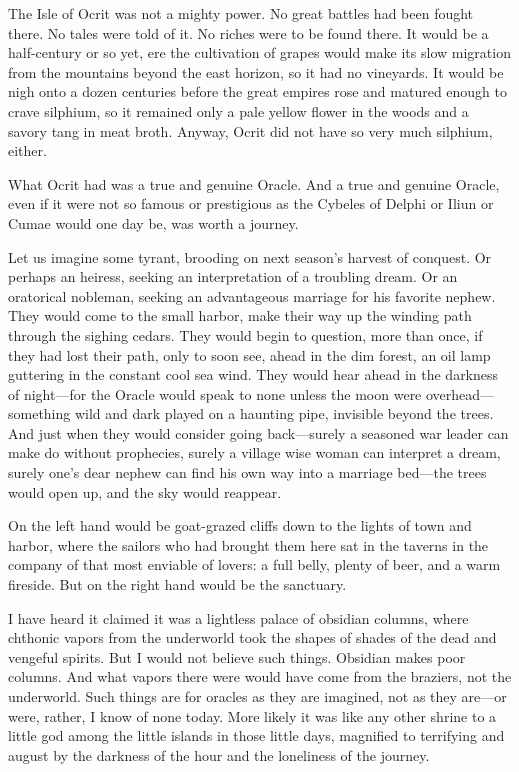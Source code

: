 The Isle of Ocrit was not a mighty power. No great battles had been fought there. No tales were told of it. No riches were to be found there. It would be a half-century or so yet, ere the cultivation of grapes would make its slow migration from the mountains beyond the east horizon, so it had no vineyards. It would be nigh onto a dozen centuries before the great empires rose and matured enough to crave silphium, so it remained only a pale yellow flower in the woods and a savory tang in meat broth. Anyway, Ocrit did not have so very much silphium, either.

What Ocrit had was a true and genuine Oracle. And a true and genuine Oracle, even if it were not so famous or prestigious as the Cybeles of Delphi or Iliun or Cumae would one day be, was worth a journey.

Let us imagine some tyrant, brooding on next season's harvest of conquest. Or perhaps an heiress, seeking an interpretation of a troubling dream. Or an oratorical nobleman, seeking an advantageous marriage for his favorite nephew. They would come to the small harbor, make their way up the winding path through the sighing cedars. They would begin to question, more than once, if they had lost their path, only to soon see, ahead in the dim forest, an oil lamp guttering in the constant cool sea wind. They would hear ahead in the darkness of night---for the Oracle would speak to none unless the moon were overhead---something wild and dark played on a haunting pipe, invisible beyond the trees. And just when they would consider going back---surely a seasoned war leader can make do without prophecies, surely a village wise woman can interpret a dream, surely one's dear nephew can find his own way into a marriage bed---the trees would open up, and the sky would reappear.

On the left hand would be goat-grazed cliffs down to the lights of town and harbor, where the sailors who had brought them here sat in the taverns in the company of that most enviable of lovers: a full belly, plenty of beer, and a warm fireside. But on the right hand would be the sanctuary.

I have heard it claimed it was a lightless palace of obsidian columns, where chthonic vapors from the underworld took the shapes of shades of the dead and vengeful spirits. But I would not believe such things. Obsidian makes poor columns. And what vapors there were would have come from the braziers, not the underworld. Such things are for oracles as they are imagined, not as they are---or were, rather, I know of none today. More likely it was like any other shrine to a little god among the little islands in those little days, magnified to terrifying and august by the darkness of the hour and the loneliness of the journey.

